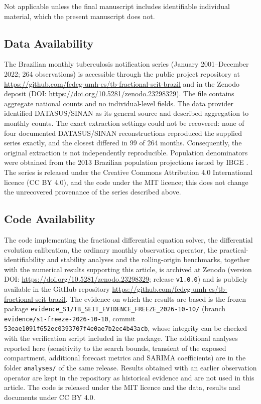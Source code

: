 \documentclass[pdflatex,sn-mathphys-ay]{sn-jnl}
\begin{document}
Not applicable unless the final manuscript includes identifiable individual material, which the present manuscript does not.

\subsection{Data Availability}

The Brazilian monthly tuberculosis notification series (January 2001--December 2022; 264 observations) is accessible through the public project repository at \url{https://github.com/fedeg-umh-es/tb-fractional-seit-brazil} and in the Zenodo deposit (DOI: \url{https://doi.org/10.5281/zenodo.23298329}). The file contains aggregate national counts and no individual-level fields. The data provider identified DATASUS/SINAN as its general source and described aggregation to monthly counts. The exact extraction settings could not be recovered: none of four documented DATASUS/SINAN reconstructions reproduced the supplied series exactly, and the closest differed in 99 of 264 months. Consequently, the original extraction is not independently reproducible. Population denominators were obtained from the 2013 Brazilian population projections issued by IBGE \citep{ibge2013}. The series is released under the Creative Commons Attribution 4.0 International licence (CC BY 4.0), and the code under the MIT licence; this does not change the unrecovered provenance of the series described above.

\subsection{Code Availability}

The code implementing the fractional differential equation solver, the differential evolution calibration, the ordinary monthly observation operator, the practical-identifiability and stability analyses and the rolling-origin benchmarks, together with the numerical results supporting this article, is archived at Zenodo (version DOI: \url{https://doi.org/10.5281/zenodo.23298329}; release \texttt{v1.0.0}) and is publicly available in the GitHub repository \url{https://github.com/fedeg-umh-es/tb-fractional-seit-brazil}. The evidence on which the results are based is the frozen package \nolinkurl{evidence_S1/TB_SEIT_EVIDENCE_FREEZE_2026-10-10/} (branch \nolinkurl{evidence/s1-freeze-2026-10-10}, commit \texttt{53eae1091f652ec03937\allowbreak 07f4e0ae7b2ec4b43acb}, whose integrity can be checked with the verification script included in the package. The additional analyses reported here (sensitivity to the search bounds, transient of the exposed compartment, additional forecast metrics and SARIMA coefficients) are in the folder \texttt{analyses/} of the same release. Results obtained with an earlier observation operator are kept in the repository as historical evidence and are not used in this article. The code is released under the MIT licence and the data, results and documents under CC BY 4.0.
\end{document}
